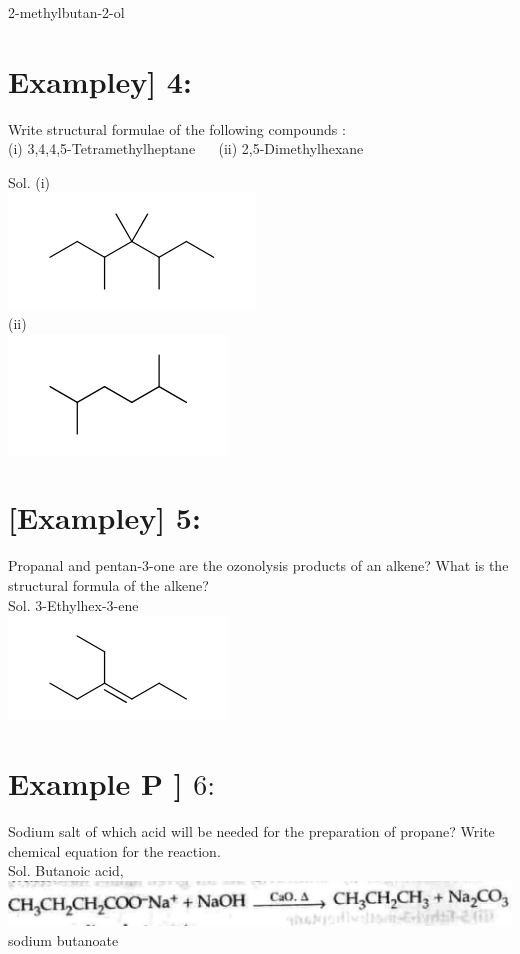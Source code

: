 \documentclass[10pt]{article}
\begin{document}
2-methylbutan-2-ol

\section*{Exampley] 4:}
Write structural formulae of the following compounds :\\
(i) 3,4,4,5-Tetramethylheptane $\quad$ (ii) 2,5-Dimethylhexane

Sol. (i)\\
\includegraphics{smile-c6a66b59d50717e9e05d1b09331ee3de040f4812}\\
(ii)\\
\includegraphics{smile-b6fbed03a5c4ef997d3bca016c0257164598a183}

\section*{[Exampley] 5:}
Propanal and pentan-3-one are the ozonolysis products of an alkene? What is the structural formula of the alkene?\\
Sol. 3-Ethylhex-3-ene\\
\includegraphics{smile-9ff1449bcae62de23b06476beaf0086ae9b6bfcb}

\section*{Example P ] $6:$}
Sodium salt of which acid will be needed for the preparation of propane? Write chemical equation for the reaction.\\
Sol. Butanoic acid,\\
\includegraphics[max width=\textwidth]{2025_01_28_8470952b98110cec3aabg-219} sodium butanoate
\end{document}
